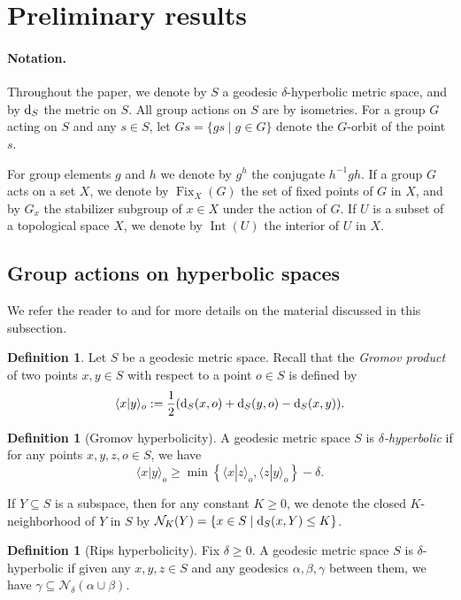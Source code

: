 \documentclass[11pt,letterpaper]{article}
\renewcommand{\d}{{\rm d}}
\renewcommand{\d}{{\rm d}}
\renewcommand{\l}{\langle}
\renewcommand{\r}{\rangle}
\DeclareMathOperator{\Int}{Int}
\DeclareMathOperator{\Fix}{Fix}
\theoremstyle{definition}
\newtheorem{defn}[thm]{Definition}
\theoremstyle{remark}
\begin{document}
\section{Preliminary results}\label{preliminary}

\paragraph{Notation.}
Throughout the paper, we denote by $S$ a geodesic $\delta$-hyperbolic metric space, and by $\d_S$ the metric on $S$. All group actions on $S$ are by isometries. For a group $G$ acting on $S$ and any $s\in S$, let $Gs=\{ gs\mid g\in G\}$ denote the $G$-orbit of the point $s$.

For group elements $g$ and $h$ we denote by $g^h$ the conjugate $h^{-1}gh$.
If a group $G$ acts on a set $X$, we denote by $\Fix_X(G)$ the set of fixed points of $G$ in $X$, and by $G_x$ the stabilizer subgroup of $x \in X$ under the action of $G$. If $U$ is a subset of a topological space $X$, we denote by $\Int(U)$ the interior of $U$ in $X$.

\subsection{Group actions on hyperbolic spaces}\label{Group actions on hyperbolic spaces}
We refer the reader to \cite[Chapter 3]{DSU} and \cite{BS07} for more details on the material discussed in this subsection.

\begin{defn}\label{Gromov product}
Let $S$ be a geodesic metric space. Recall that the \textit{Gromov product} of two points $x, y \in S$ with respect to a point $o \in S$ is defined by
$$
\l x|y\r_o:=\frac{1}{2}(\d_S(x, o)+\d_S(y, o)-\d_S(x, y)).
$$
\end{defn}
\begin{defn}[Gromov hyperbolicity]\label{four point condition}
A geodesic metric space $S$ is  {\it $\delta$-hyperbolic} if for any points $x, y, z, o \in S$, we have
$$
\l x|y \r_o \geq \min\left\{\l x|z \r_o, \l z|y\r_o\right\} - \delta.
$$ 
\end{defn}
If $Y \subseteq S$ is a subspace, then for any constant $K \geq 0$, we denote the closed $K$-neighborhood of $Y$ in $S$ by $\mathcal{N}_K(Y)=\left\{x \in S \mid \d_S(x, Y) \leq K\right\}$.

\begin{defn}[Rips hyperbolicity]\label{rips def} 
Fix $\delta \geq 0$. A geodesic metric space $S$ is $\delta$-hyperbolic if given any $x, y, z \in S$ and any geodesics $\alpha, \beta, \gamma$ between them, we have $\gamma \subseteq \mathcal{N}_\delta(\alpha \cup \beta)$.
\end{defn}
\end{document}
